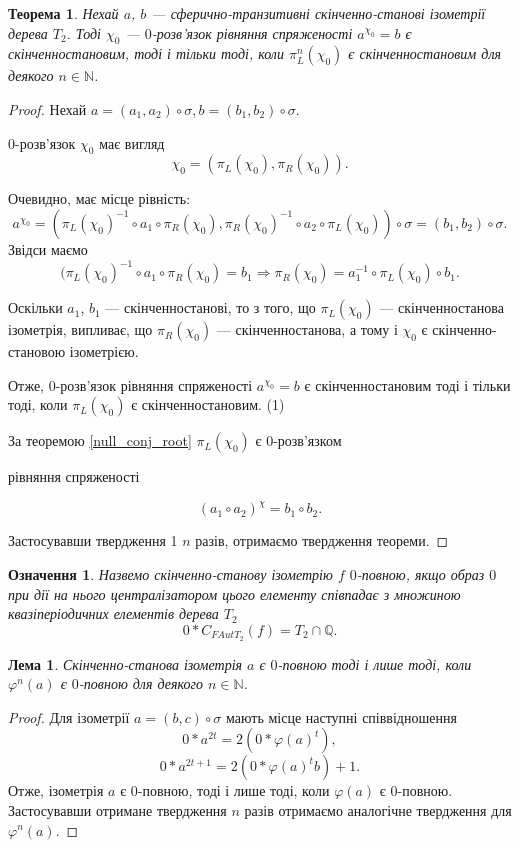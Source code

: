 \documentclass[a4paper,12pt]{article} \usepackage{a4wide}
\numberwithin{equation}{subsection}
\newtheorem{theorem}{Теорема}[subsection]
\newtheorem{lemma}{Лема}[subsection]
\newtheorem{definition}{Означення}[subsection]
\begin{document}
   \begin{theorem}
     Нехай $a$, $b$ --- сферично-транзитивні скінченно-станові ізометрії
     дерева $T_2$. Тоді $\chi_0$ ---
     $0$-розв'язок рівняння спряженості $a^{\chi_0}=b$ є
     скінченностановим, тоді і тільки тоді, коли $\pi_L^n(\chi_0)$ є
     скінченностановим для деякого $n \in \mathbb{N}$.
   \end{theorem}
   \begin{proof}
     Нехай $a = (a_1, a_2)\circ\sigma, b = (b_1, b_2)\circ\sigma$.

     $0$-розв'язок $\chi_0$ має вигляд $$\chi_0 =
     (\pi_L(\chi_0),\pi_R(\chi_0)). $$

     Очевидно, має місце рівність:
$$a^{\chi_0}=(\pi_L(\chi_0)^{-1}\circ a_1 \circ \pi_R(\chi_0),\pi_R(\chi_0)^{-1}\circ a_2 \circ \pi_L(\chi_0) )\circ\sigma=(b_1, b_2)\circ\sigma. $$
Звідси маємо
$$(\pi_L(\chi_0)^{-1}\circ a_1 \circ \pi_R(\chi_0) = b_1 \Rightarrow \pi_R(\chi_0) = a_1^{-1}\circ \pi_L(\chi_0)\circ b_1. $$

Оскільки $a_1$, $b_1$ --- скінченностанові, то з того, що $\pi_L(\chi_0)$
--- скінченностанова ізометрія, випливає, що  $\pi_R(\chi_0)$ ---
скінченностанова, а тому і $\chi_0$ є скінченно-становою ізометрією.

Отже, $0$-розв'язок рівняння спряженості $a^{\chi_0}=b$ є
скінченностановим тоді і тільки тоді, коли $\pi_L(\chi_0)$ є
скінченностановим. (1)

За теоремою \ref{null_conj_root} $\pi_L(\chi_0)$ є $0$-розв'язком

рівняння спряженості


$$(a_1\circ a_2)^{\chi}= b_1\circ b_2. $$

 Застосувавши  твердження 1 $n$ разів, отримаємо твердження теореми.
\end{proof}

 \begin{definition}
   Назвемо скінченно-станову ізометрію $f$ $0$-повною, якщо образ $0$ при
   дії на нього централізатором цього елементу співпадає з множиною
   квазіперіодичних елементів дерева $T_2$
$$0*C_{FAutT_2}(f) = T_2\cap \mathbb{Q}. $$
\end{definition}

\begin{lemma}\label{varphi_n_zero_full}
  Скінченно-станова ізометрія $a$ є $0$-повною тоді і лише тоді, коли
  $\varphi^n(a)$ є $0$-повною для деякого $n \in \mathbb{N}$.
\end{lemma}
\begin{proof}
  Для ізометрії $a = (b,c)\circ \sigma$ мають місце наступні
  співвідношення
  $$0*a^{2t}=2(0*\varphi(a)^t), $$
  $$0*a^{2t+1}=2(0*\varphi(a)^tb)+1.$$
  Отже, ізометрія $a$  є $0$-повною, тоді і лише тоді, коли $\varphi(a)$
  є $0$-повною. Застосувавши отримане твердження $n$ разів отримаємо
  аналогічне твердження для $\varphi^n(a)$.
\end{proof}
\end{document}
